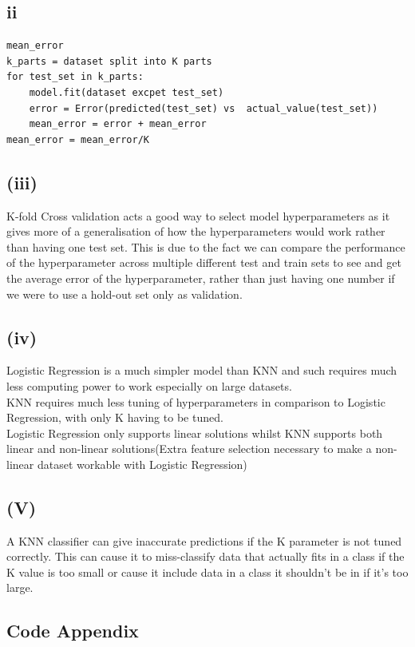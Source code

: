 \documentclass[11pt]{article} %
\begin{document}
\subsection{{ii}}
\begin{verbatim}
mean_error 
k_parts = dataset split into K parts
for test_set in k_parts:
    model.fit(dataset excpet test_set)
    error = Error(predicted(test_set) vs  actual_value(test_set))
    mean_error = error + mean_error
mean_error = mean_error/K
\end{verbatim}
\subsection{(iii)}
K-fold Cross validation acts a good way to select model hyperparameters as it gives more of a generalisation of how the hyperparameters would work rather than having one test set.  This is due to the fact we can compare the performance of the hyperparameter across multiple different test and train sets to see and get the average error of the hyperparameter,  rather than just having one number if we were to use a hold-out set only as validation. 
\subsection{(iv)}
Logistic Regression is a much simpler model than KNN and such requires much less computing power to work especially on large datasets.
\\ KNN requires much less tuning of hyperparameters in comparison to Logistic Regression,  with only K having to be tuned.
\\ Logistic Regression only supports linear solutions whilst KNN supports both linear and non-linear solutions(Extra feature selection necessary to make a non-linear dataset workable with Logistic Regression)
\subsection{(V)}
A KNN classifier can give inaccurate predictions if the K parameter is not tuned correctly.  This can cause it to miss-classify data that actually fits in a class if the K value is too small or cause it include data in a class it shouldn't be in if it's too large.
\subsection{Code Appendix}
\end{document}
